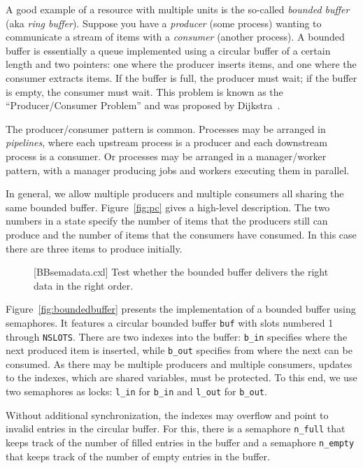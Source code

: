 \documentclass{report}
\newenvironment{code}{
\tcolorbox
}{
\endtcolorbox
}
\begin{document}
A good example of a resource with multiple units is the
so-called \emph{bounded buffer} (aka \emph{ring buffer}).
Suppose you have a \emph{producer} (some process) wanting to
communicate a stream of items with a \emph{consumer} (another process).
A bounded buffer is essentially
a queue implemented using a circular buffer
of a certain length and two pointers:
one where the producer inserts items, and one where the consumer extracts
items.  If the
buffer is full, the producer must wait; if the buffer is empty, the
consumer must wait.
This problem is known as the ``Producer/Consumer Problem'' and was
proposed by Dijkstra~\cite{EWD329}.

The producer/consumer pattern is common.  Processes may be arranged
in \emph{pipelines},
where each upstream process is a producer and each downstream
process is a consumer.
Or processes may be arranged in a manager/worker pattern, with a manager
producing jobs and workers executing them in parallel.

In general, we allow multiple producers and multiple consumers
all sharing the same bounded buffer.
Figure~\ref{fig:pc} gives a high-level description.  The
two numbers in a state specify
the number of items that the producers still can produce and
the number of items that the consumers have consumed.  In this case
there are three items to produce initially.

\begin{figure}
\begin{code}
\end{code}
\caption{[BBsemadata.cxl] Test whether the bounded buffer delivers the right data in the
right order.}
\label{fig:PCsemadata}
\end{figure}

Figure~\ref{fig:boundedbuffer} presents the implementation of a bounded
buffer using semaphores.  It features a circular bounded buffer \texttt{buf} with
slots numbered 1 through \texttt{NSLOTS}.  There are two indexes into
the buffer: \texttt{b\_in} specifies where the next produced item is inserted,
while \texttt{b\_out} specifies from where the next can be consumed.
As there may be multiple producers and multiple
consumers, updates to the indexes, which are shared variables, must be protected.
To this end, we use two semaphores as locks: \texttt{l\_in} for \texttt{b\_in}
and \texttt{l\_out} for \texttt{b\_out}.

Without additional synchronization, the indexes may overflow and point to invalid
entries in the circular buffer.
For this, there is a semaphore \texttt{n\_full} that
keeps track of the number of filled entries in the buffer and a semaphore
\texttt{n\_empty} that keeps track of the number of empty entries in the buffer.
\end{document}

